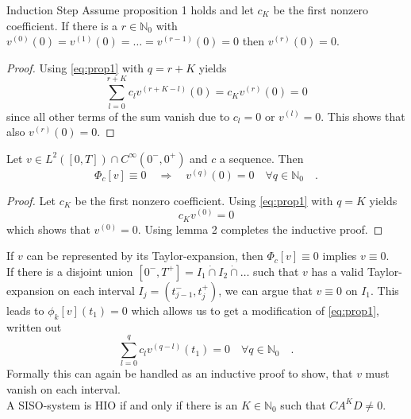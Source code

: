 \begin{lemma}{Induction Step}{}
	Assume proposition 1 holds and let $c_K$ be the first nonzero coefficient. 
	If there is a $r\in\mathbb{N}_0$ with $v^{(0)}(0)=
	v^{(1)}(0)=\ldots= v^{(r-1)}(0)=0$ then $v^{(r)}(0)=0$. 
\end{lemma}
\begin{proof}
	Using \eqref{eq:prop1} with $q = r+K$ yields 
	\begin{equation}
	\sum\limits_{l=0}^{r+K} c_l v^{(r+K-l)}(0) = c_K v^{(r)}(0) = 0
	\end{equation}
	since all other terms of the sum vanish due to $c_l=0$ or $v^{(l)}=0$. This shows 
	that also $v^{(r)}(0)=0$.
\end{proof}

\begin{theorem}{}{}
	Let $v\in L^2([0,T])\cap C^\infty(0^-,0^+)$ and $c$ a sequence. Then
	\begin{equation}
	\Phi_c[v] \equiv 0\quad  \Rightarrow\quad v^{(q)}(0) = 0
	 \quad \forall q\in\mathbb{N}_0 \quad .
	\end{equation}
\end{theorem}
\begin{proof}
	Let $c_K$ be the first nonzero coefficient. Using \eqref{eq:prop1} with $q=K$ yields 
	\begin{equation}
	c_K v^{(0)} = 0 
	\end{equation}
	which shows that $v^{(0)}=0$. Using lemma 2 completes the inductive proof.
\end{proof}

\begin{corollary}{}{}
	If $v$ can be represented by its Taylor-expansion, then $\Phi_c[v]\equiv 0$ implies 
	$v\equiv 0$.\\
	
	If there is a disjoint union $[0^-,T^+] = I_1\dot{\cap} I_2 \dot{\cap}\ldots$ such 
	that 
	$v$ has a valid Taylor-expansion on each interval $I_j=(t_{j-1}^-,t_j^+)$, we can argue 
	that $v\equiv 0$ on $I_1$. This leads to $\phi_k[v](t_1)=0$ which allows us to get 
	a modification of \eqref{eq:prop1}, written out
	\begin{equation}
	\sum\limits_{l=0}^q c_l v^{(q-l)}(t_1) = 0 \quad \forall q \in \mathbb{N}_0 \quad .
	\end{equation}
	Formally this can again be handled as an inductive proof to show, that $v$ must 
	vanish on each interval.\\
	
	A SISO-system is HIO if and only if there is an $K\in\mathbb{N}_0$ such that   
	$CA^KD \neq 0$. 
\end{corollary}

